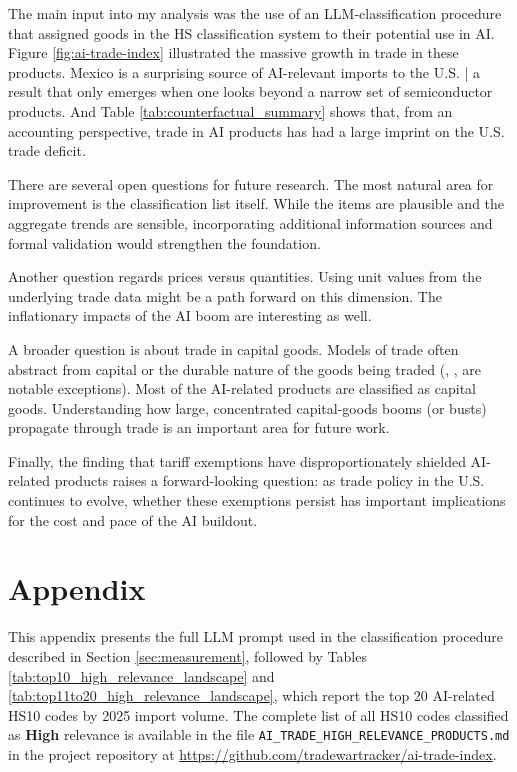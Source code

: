 \documentclass[12pt,pdftex]{article}
\begin{document}
\begin{onehalfspacing}
The main input into my analysis was the use of an LLM-classification procedure that assigned goods in the HS classification system to their potential use in AI. Figure \ref{fig:ai-trade-index} illustrated the massive growth in trade in these products. Mexico is a surprising source of AI-relevant imports to the U.S. | a result that only emerges when one looks beyond a narrow set of semiconductor products. And Table \ref{tab:counterfactual_summary} shows that, from an accounting perspective, trade in AI products has had a large imprint on the U.S. trade deficit.

There are several open questions for future research. The most natural area for improvement is the classification list itself. While the items are plausible and the aggregate trends are sensible, incorporating additional information sources and formal validation would strengthen the foundation.

Another question regards prices versus quantities. Using unit values from the underlying trade data might be a path forward on this dimension. The inflationary impacts of the AI boom are interesting as well.

A broader question is about trade in capital goods. Models of trade often abstract from capital or the durable nature of the goods being traded (\citet{eaton2001capital}, \citet*{eaton2016trade}, \citet*{ravikumar2019capital} are notable exceptions). Most of the AI-related products are classified as capital goods. Understanding how large, concentrated capital-goods booms (or busts) propagate through trade is an important area for future work.

Finally, the finding that tariff exemptions have disproportionately shielded AI-related products raises a forward-looking question: as trade policy in the U.S. continues to evolve, whether these exemptions persist has important implications for the cost and pace of the AI buildout.

\newpage




\newpage

\section{Appendix}\label{appendix}

This appendix presents the full LLM prompt used in the classification procedure described in Section \ref{sec:measurement}, followed by Tables \ref{tab:top10_high_relevance_landscape} and \ref{tab:top11to20_high_relevance_landscape}, which report the top 20 AI-related HS10 codes by 2025 import volume. The complete list of all HS10 codes classified as \textbf{High} relevance is available in the file \texttt{AI\_TRADE\_HIGH\_RELEVANCE\_PRODUCTS.md} in the project repository at \url{https://github.com/tradewartracker/ai-trade-index}.


\end{onehalfspacing}
\end{document}
